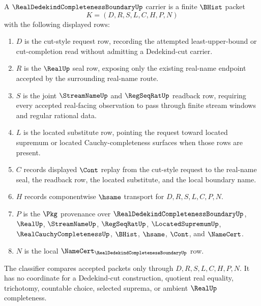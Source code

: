\begin{definition}
\label{def:real-dedekind-completeness-boundary-carrier}
A $\RealDedekindCompletenessBoundaryUp$ carrier is a finite $\BHist$ packet
$$
K=(D,R,S,L,C,H,P,N)
$$
with the following displayed rows:
\begin{enumerate}
\item $D$ is the cut-style request row, recording the attempted least-upper-bound or cut-completion read without admitting a Dedekind-cut carrier.
\item $R$ is the $\RealUp$ seal row, exposing only the existing real-name endpoint accepted by the surrounding real-name route.
\item $S$ is the joint $\StreamNameUp$ and $\RegSeqRatUp$ readback row, requiring every accepted real-facing observation to pass through finite stream windows and regular rational data.
\item $L$ is the located substitute row, pointing the request toward located supremum or located Cauchy-completeness surfaces when those rows are present.
\item $C$ records displayed $\Cont$ replay from the cut-style request to the real-name seal, the readback row, the located substitute, and the local boundary name.
\item $H$ records componentwise $\hsame$ transport for $D,R,S,L,C,P,N$.
\item $P$ is the $\Pkg$ provenance over $\RealDedekindCompletenessBoundaryUp$, $\RealUp$, $\StreamNameUp$, $\RegSeqRatUp$, $\LocatedSupremumUp$, $\RealCauchyCompletenessUp$, $\BHist$, $\hsame$, $\Cont$, and $\NameCert$.
\item $N$ is the local $\NameCert_{\RealDedekindCompletenessBoundaryUp}$ row.
\end{enumerate}
The classifier compares accepted packets only through $D,R,S,L,C,H,P,N$. It has no coordinate for a Dedekind-cut construction, quotient real equality, trichotomy, countable choice, selected suprema, or ambient $\RealUp$ completeness.
\end{definition}

